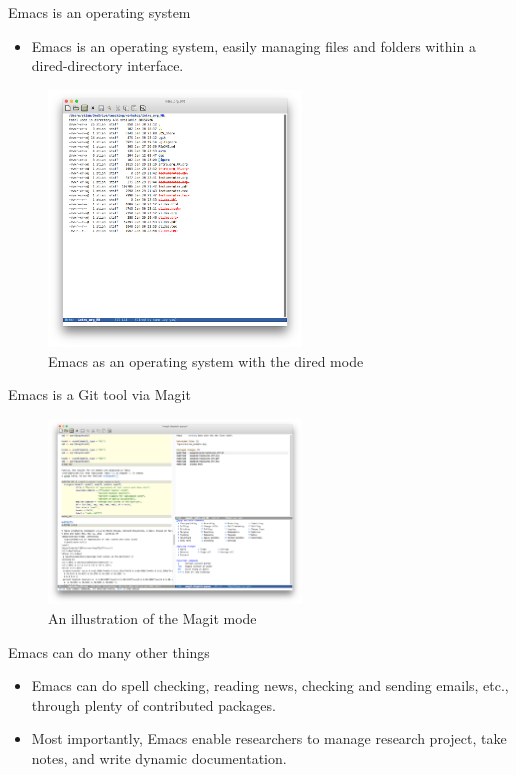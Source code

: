 \documentclass[presentation]{beamer}
\begin{document}
\begin{frame}[label={sec:orgc8ef3a5}]{Emacs is an operating system}
\begin{itemize}
\item Emacs is an operating system, easily managing files and folders
within a dired-directory interface.
\end{itemize}

\begin{figure}[htbp]
\centering
\includegraphics[width=0.6\textwidth,height=0.6\textheight]{figure/dired_example.png}
\caption{Emacs as an operating system with the dired mode}
\end{figure}
\end{frame}

\begin{frame}[label={sec:org57882e0}]{Emacs is a Git tool via Magit}
\begin{figure}[htbp]
\centering
\includegraphics[width=0.6\textwidth]{figure/magit_example.png}
\caption{An illustration of the Magit mode}
\end{figure}
\end{frame}

\begin{frame}[label={sec:orgb40e4df}]{Emacs can do many other things}
\begin{itemize}
\item Emacs can do spell checking, reading news, checking and sending
emails, etc., through plenty of contributed packages.
\item Most importantly, Emacs enable researchers to manage research
project, take notes, and write dynamic documentation.
\end{itemize}
\end{frame}
\end{document}

